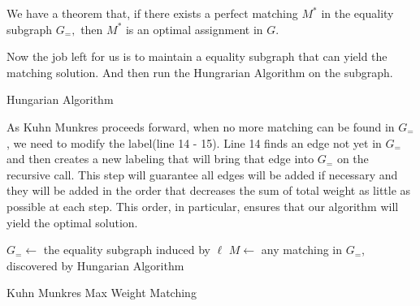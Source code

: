 \begin{exercise}[]
\begin{solution}
  We have a theorem that, if there exists a perfect matching $M^{*}$ in the equality subgraph $G_{=},$ then $M^{*}$ is an optimal assignment in $G$.

  Now the job left for us is to maintain a equality subgraph that can yield the matching solution. And then run the Hungrarian Algorithm on the subgraph.

  \begin{algorithm}[H]
    \BlankLine
    \caption{Hungarian Algorithm}
  \end{algorithm}

  As Kuhn Munkres proceeds forward, when no more matching can be found in $G_{=}$, we need to modify the label(line 14 - 15). Line 14 finds an edge not yet in $G_{=}$ and then creates a new labeling that will bring that edge into $G_{=}$ on the recursive call. This step will guarantee all edges will be added if necessary and they will be added in the order that decreases the sum of total weight as little as possible at each step. This order, in particular, ensures that our algorithm will yield the optimal solution.

  \begin{algorithm}[H]
    \BlankLine
    $G_{=} \leftarrow$ the equality subgraph induced by $\ell$\;
    $M \leftarrow$ any matching in $G_{=}$, discovered by Hungarian Algorithm \;
    \caption{Kuhn Munkres Max Weight Matching}
  \end{algorithm}


\end{solution}
\end{exercise}
